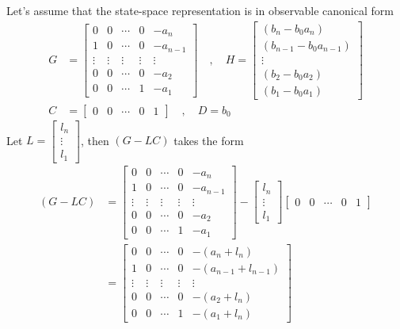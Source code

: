 \documentclass[twoside]{article}
\begin{document}
Let's assume that the state-space representation is in observable 
canonical form 
%
\begin{align*}
G &= \left[ \begin{array}{ccccc} 0 & 0 & \cdots & 0 & -a_{n} 
              \\ 1 & 0 & \cdots & 0 & -a_{n-1} 
\\ \vdots & \vdots & \vdots & \vdots & \vdots
\\ 0 & 0 & \cdots & 0 & -a_2
    \\ 0 & 0 & \cdots & 1 & -a_1 \end{array} \right]
\quad , \quad 
H = \left[ \begin{array}{c} (b_n - b_0 a_n)  \\ (b_{n-1} - b_0
             a_{n-1}) \\ \vdots \\ (b_2 - b_0 a_2) \\   (b_1 - b_0
             a_1) 
\end{array} \right]
\\ C &= \left[ \begin{array}{ccccc} 0 & 0 & \cdots &  0 & 1 \end{array} \right]
\quad , \quad
D = b_0
\end{align*}
%
Let $L = \left[ \begin{array}{c} l_n \\ \vdots \\ l_1 \end{array} \right]$, then
$( G - L C )$ takes the form
%
\begin{align*}
\left( G - L C \right) &= \left[ \begin{array}{ccccc} 0 & 0 & \cdots & 0 & -a_{n} 
              \\ 1 & 0 & \cdots & 0 & -a_{n-1} 
\\ \vdots & \vdots & \vdots & \vdots & \vdots
\\ 0 & 0 & \cdots & 0 & -a_2
    \\ 0 & 0 & \cdots & 1 & -a_1 \end{array} \right]
- \left[ \begin{array}{c} l_n \\ \vdots \\ l_1 \end{array} \right]
\left[ \begin{array}{ccccc} 0 & 0 & \cdots &  0 & 1 \end{array}
                                                  \right]
\\
&= 
\left[ \begin{array}{ccccc} 0 & 0 & \cdots & 0 & -(a_{n} + l_n)
              \\ 1 & 0 & \cdots & 0 & - (a_{n-1} + l_{n-1})
\\ \vdots & \vdots & \vdots & \vdots & \vdots
\\ 0 & 0 & \cdots & 0 & - (a_2 + l_n)
    \\ 0 & 0 & \cdots & 1 & - (a_1 + l_n) \end{array} \right]
\end{align*}
\end{document}

